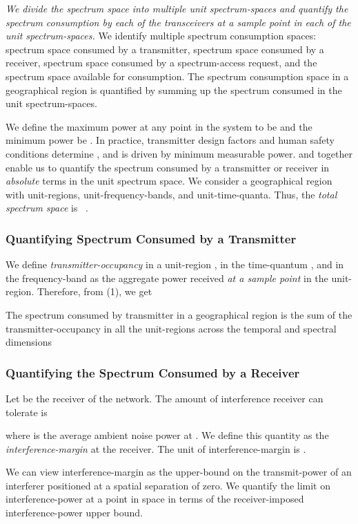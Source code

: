 \documentclass[12pt, draftclsnofoot, onecolumn]{IEEEtran}
\begin{document}
\textit{We divide the spectrum space into multiple unit spectrum-spaces and quantify the spectrum consumption by each of the transceivers at a sample point in each of the unit spectrum-spaces.} We identify multiple spectrum consumption spaces: spectrum space consumed by a transmitter, spectrum space consumed by a receiver, spectrum space consumed by a spectrum-access request, and the spectrum space available for consumption. The spectrum consumption space in a geographical region is quantified by summing up the spectrum consumed in the unit spectrum-spaces.

We define the maximum power at any point in the system to be  and the minimum power be . In practice, transmitter design factors and human safety conditions determine , and  is driven by minimum measurable power.  and  together enable us to quantify the spectrum consumed by a transmitter or receiver in \textit{absolute} terms in the unit spectrum space. We consider a geographical region with  unit-regions,  unit-frequency-bands, and  unit-time-quanta. Thus, the \textit{total spectrum space} is  \ .

\subsubsection{Quantifying Spectrum Consumed by a Transmitter}
We define \textit{transmitter-occupancy} in a unit-region , in the time-quantum , and in the frequency-band  as the aggregate power received \textit{at a sample point}  in the unit-region. Therefore, from (1), we get 


The spectrum consumed by transmitter  in a geographical region is the sum of the transmitter-occupancy in all the unit-regions across the temporal and spectral dimensions


\subsubsection{Quantifying the Spectrum Consumed by a Receiver}
\noindent
Let  be the  receiver of the  network. The amount of interference receiver  can tolerate is

where  is the average ambient noise power at . We define this quantity as the \textit{interference-margin} at the receiver. The unit of interference-margin is .

We can view interference-margin  as the upper-bound on the transmit-power of an interferer positioned at a spatial separation of zero. We quantify the limit on interference-power at a point  in space in terms of the receiver-imposed interference-power upper bound.
\end{document}
